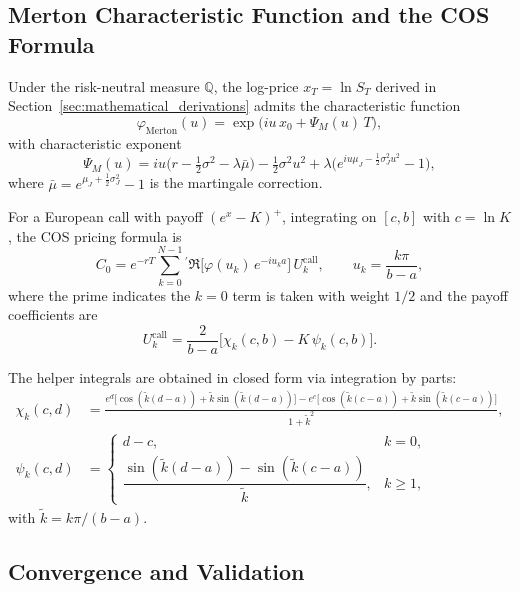 \documentclass[12pt]{article}
\begin{document}
\subsection*{Merton Characteristic Function and the COS Formula}

Under the risk-neutral measure $\mathbb{Q}$, the log-price
$x_T = \ln S_T$ derived in Section~\ref{sec:mathematical_derivations}
admits the characteristic function
\begin{equation}
  \varphi_{\text{Merton}}(u) = \exp\!\bigl(iu\,x_0 + \Psi_M(u)\,T\bigr),
  \label{eq:cos_merton_cf}
\end{equation}
with characteristic exponent
\begin{equation}
  \Psi_M(u)
    = iu\bigl(r-\tfrac{1}{2}\sigma^2-\lambda\bar{\mu}\bigr)
      -\tfrac{1}{2}\sigma^2 u^2
      + \lambda\bigl(e^{i u\mu_J - \frac{1}{2}\sigma_J^2 u^2}-1\bigr),
\end{equation}
where $\bar{\mu} = e^{\mu_J + \tfrac{1}{2}\sigma_J^2}-1$ is the
martingale correction.

For a European call with payoff $(e^{x}-K)^{+}$, integrating on
$[c,b]$ with $c=\ln K$, the COS pricing formula is
\begin{equation}\label{eq:cos_call_formula}
  C_0 = e^{-rT}\sum_{k=0}^{N-1}{}^{\prime}
        \Re\!\bigl[\varphi(u_k)\,e^{-iu_k a}\bigr]\,U_k^{\text{call}},
  \qquad u_k = \frac{k\pi}{b-a},
\end{equation}
where the prime indicates the $k=0$ term is taken with weight $1/2$
and the payoff coefficients are
\begin{equation}
  U_k^{\text{call}} = \frac{2}{b-a}\bigl[\chi_k(c,b) - K\,\psi_k(c,b)\bigr].
\end{equation}

The helper integrals are obtained in closed form via integration by
parts:
\begin{align}
  \chi_k(c,d) &= \frac{e^d\!\bigl[\cos(\tilde k(d-a))+\tilde k\sin(\tilde k(d-a))\bigr]
                       -e^c\!\bigl[\cos(\tilde k(c-a))+\tilde k\sin(\tilde k(c-a))\bigr]}
                      {1+\tilde k^2}, \\[4pt]
  \psi_k(c,d) &= \begin{cases}
    d-c, & k=0,\\[3pt]
    \dfrac{\sin(\tilde k(d-a))-\sin(\tilde k(c-a))}{\tilde k}, & k\geq 1,
  \end{cases}
\end{align}
with $\tilde k = k\pi/(b-a)$.

\subsection*{Convergence and Validation}
\end{document}
